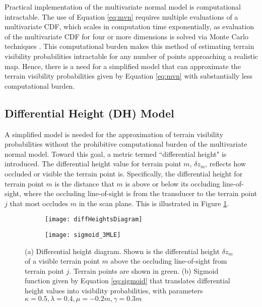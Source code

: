 Practical implementation of the multivariate normal model is computational intractable. 
The use of Equation \ref{eq:mvn} requires multiple evaluations of a multivariate CDF, which scales in computation time exponentially, as evaluation of the multivariate CDF for four or more dimensions is solved via Monte Carlo techniques \cite{Genz1992}.
This computational burden makes this method of estimating terrain visibility probabilities intractable for any number of points approaching a realistic map.  
Hence, there is a need for a simplified model that can approximate the terrain visibility probabilities given by Equation \ref{eq:mvn} with substantially less computational burden.

\subsection{Differential Height (DH) Model}
\label{visibility.Visibility.DH}

A simplified model is needed for the approximation of terrain visibility probabilities without the prohibitive computational burden of the multivariate normal model. Toward this goal, a metric termed ``differential height" is introduced. The differential height value for terrain point $m$, $\delta z_m$, reflects how occluded or visible the terrain point is.  
Specifically, the differential height for terrain point $m$ is the distance that $m$ is above or below its occluding line-of-sight, where the occluding line-of-sight is from the transducer to the terrain point $j$ that most occludes $m$ in the scan plane. This is illustrated in Figure \ref{fig:diffHeightsDiagram}.

\begin{figure} [!h]
	\centering
	\begin{subfigure}[b]{0.44\textwidth}
                \texttt{[image: diffHeightsDiagram]}
                \caption{}
                \label{fig:diffHeightsDiagram}
	\end{subfigure}
  	\centering
	\begin{subfigure}[b]{0.52\textwidth}
                \texttt{[image: sigmoid\_3MLE]}
		\caption{}
		\label{fig:sigmoid1}
  	\end{subfigure}
	\caption{(a) Differential height diagram. Shown is the differential height $\delta z_m$ of a visible terrain point $m$ above the occluding line-of-sight from terrain point $j$.  Terrain points are shown in green. (b) Sigmoid function given by Equation \ref{eq:sigmoid} that translates differential height values into visibility probabilities, with parameters $\kappa = 0.5, \lambda = 0.4, \mu = -0.2m, \gamma = 0.3m$}
\end{figure}

